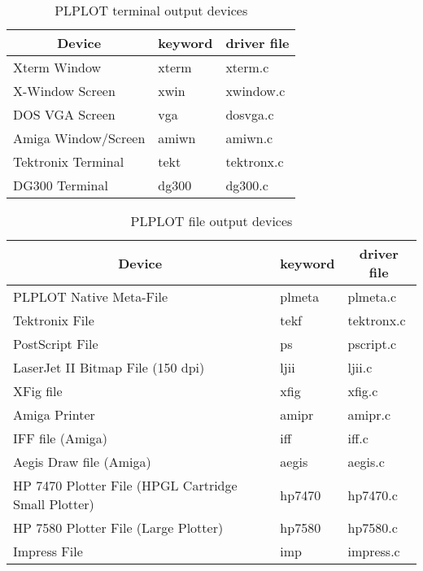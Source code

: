 \renewcommand{\arraystretch}{1.5}
\begin{table}[tb]
  \centering
  \begin{tabular}{|l|l|l|}  \hline
    \multicolumn{1}{|c}{Device} 
      & \multicolumn{1}{|c|}{keyword}
        & \multicolumn{1}{|c|}{driver file}
\\ \hline
	Xterm Window
	  & xterm
	    & xterm.c
\\ \hline
	X-Window Screen
	  & xwin
	    & xwindow.c
\\ \hline
	DOS VGA Screen
	  & vga
	    & dosvga.c
\\ \hline
	Amiga Window/Screen
	  & amiwn
	    & amiwn.c
\\ \hline
	Tektronix Terminal
	  & tekt
	    & tektronx.c
\\ \hline
	DG300 Terminal
	  & dg300
	    & dg300.c
\\ \hline
    \end{tabular}
  \caption{PLPLOT terminal output devices}
  \label{tab:dev1}
\end{table}

\begin{table}[tb]
  \centering
  \begin{tabular}{|l|l|l|}  \hline
    \multicolumn{1}{|c}{Device} 
      & \multicolumn{1}{|c|}{keyword}
        & \multicolumn{1}{|c|}{driver file}
\\ \hline
	PLPLOT Native Meta-File
	  & plmeta
	    & plmeta.c
\\ \hline
	Tektronix File
	  & tekf
	    & tektronx.c
\\ \hline
	PostScript File
	  & ps
	    & pscript.c
\\ \hline
	LaserJet II Bitmap File (150 dpi)
	  & ljii
	    & ljii.c
\\ \hline
	XFig file
	  & xfig
	    & xfig.c
\\ \hline
	Amiga Printer
	  & amipr
	    & amipr.c
\\ \hline
	IFF file (Amiga)
	  & iff
	    & iff.c
\\ \hline
	Aegis Draw file (Amiga)
	  & aegis
	    & aegis.c
\\ \hline
	HP 7470 Plotter File (HPGL Cartridge Small Plotter)
	  & hp7470
	    & hp7470.c
\\ \hline
	HP 7580 Plotter File (Large Plotter)
	  & hp7580
	    & hp7580.c
\\ \hline
	Impress File
	  & imp
	    & impress.c
\\ \hline
    \end{tabular}
  \caption{PLPLOT file output devices}
  \label{tab:dev2}
\end{table}
\renewcommand{\arraystretch}{1.0}

